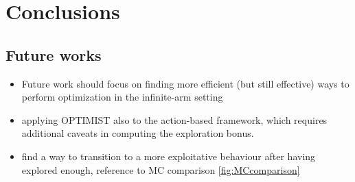
\chapter{Conclusions} \label{ch:conclusions}

\section{Future works}
\begin{itemize}
\item Future work should focus on finding more efficient (but still effective) ways to perform optimization in
the infinite-arm setting
\item applying OPTIMIST also
to the action-based framework, which requires additional
caveats in computing the exploration bonus.
\item find a way to transition to a more exploitative behaviour after having explored enough, \eg reference to MC comparison \ref{fig:MCcomparison} 
\end{itemize}